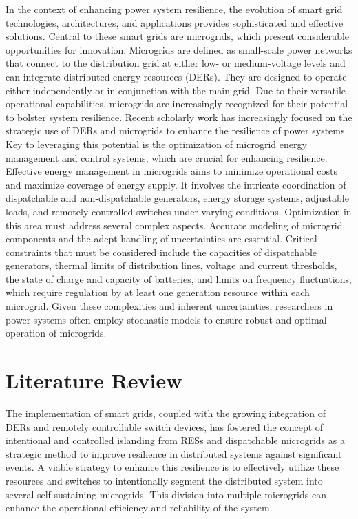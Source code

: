 \documentclass[conference]{IEEEtran}
\begin{document}
In the context of enhancing power system resilience, the evolution of smart grid technologies, architectures, and applications provides sophisticated and effective solutions. Central to these smart grids are microgrids, which present considerable opportunities for innovation. Microgrids are defined as small-scale power networks that connect to the distribution grid at either low- or medium-voltage levels and can integrate distributed energy resources (DERs). They are designed to operate either independently or in conjunction with the main grid. Due to their versatile operational capabilities, microgrids are increasingly recognized for their potential to bolster system resilience. Recent scholarly work has increasingly focused on the strategic use of DERs and microgrids to enhance the resilience of power systems. Key to leveraging this potential is the optimization of microgrid energy management and control systems, which are crucial for enhancing resilience. Effective energy management in microgrids aims to minimize operational costs and maximize coverage of energy supply. It involves the intricate coordination of dispatchable and non-dispatchable generators, energy storage systems, adjustable loads, and remotely controlled switches under varying conditions. Optimization in this area must address several complex aspects. Accurate modeling of microgrid components and the adept handling of uncertainties are essential. Critical constraints that must be considered include the capacities of dispatchable generators, thermal limits of distribution lines, voltage and current thresholds, the state of charge and capacity of batteries, and limits on frequency fluctuations, which require regulation by at least one generation resource within each microgrid. Given these complexities and inherent uncertainties, researchers in power systems often employ stochastic models to ensure robust and optimal operation of microgrids.

\section{Literature Review}
The implementation of smart grids, coupled with the growing integration of DERs and remotely controllable switch devices, has fostered the concept of intentional and controlled islanding from RESs and dispatchable microgrids as a strategic method to improve resilience in distributed systems against significant events. A viable strategy to enhance this resilience is to effectively utilize these resources and switches to intentionally segment the distributed system into several self-sustaining microgrids. This division into multiple microgrids can enhance the operational efficiency and reliability of the system.
\end{document}
